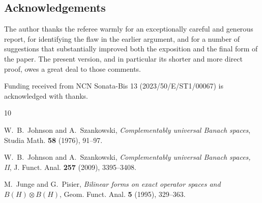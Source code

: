 \documentclass[11pt]{amsart}
\theoremstyle{plain}
\theoremstyle{remark}
\numberwithin{equation}{section}
\begin{document}
\subsection*{Acknowledgements}
The author thanks the referee warmly for an exceptionally careful and generous report, for identifying the flaw in the earlier argument, and for a number of suggestions that substantially improved both the exposition and the final form of the paper. The present version, and in particular its shorter and more direct proof, owes a great deal to those comments.

Funding received from NCN Sonata-Bis 13 (2023/50/E/ST1/00067) is acknowledged with thanks.

\begin{thebibliography}{10}

W.~B.~Johnson and A.~Szankowski,
\newblock \emph{Complementably universal Banach spaces},
\newblock Studia Math. \textbf{58} (1976), 91--97.

W.~B.~Johnson and A.~Szankowski,
\newblock \emph{Complementably universal Banach spaces, II},
\newblock J. Funct. Anal. \textbf{257} (2009), 3395--3408.

M.~Junge and G.~Pisier,
\newblock \emph{Bilinear forms on exact operator spaces and $B(H)\otimes B(H)$},
\newblock Geom. Funct. Anal. \textbf{5} (1995), 329--363.

\end{thebibliography}
\end{document}
